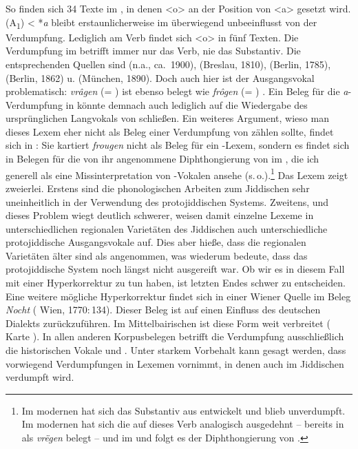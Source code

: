  
So finden sich 34 Texte im , in denen <o> an der Position von <a> gesetzt wird.  (A\textsubscript{1}) < {\urj} *\textit{a\textlengthmark} bleibt erstaunlicherweise im  überwiegend unbeeinflusst von der Verdumpfung. Lediglich am Verb  findet sich <o> in fünf Texten. Die Verdumpfung im \hai{{\LiJieins}} betrifft immer nur das Verb, nie das Substantiv. Die entsprechenden Quellen sind  (n.a., ca.\, 1900),  (Breslau, 1810),  (Berlin, 1785),  (Berlin, 1862) u.  (München, 1890). Doch auch hier ist der {\mhd} Ausgangsvokal problematisch: {\mhd} \textit{vrâgen} (= ) ist ebenso belegt wie \textit{frôgen} (= ) \parencite[Bd. 3, Sp. 487]{Lexer1992}. Ein Beleg für die \textit{a}-Verdumpfung in  könnte demnach auch lediglich auf die  Wiedergabe des ursprünglichen Langvokals von  schließen. Ein weiteres Argument, wieso man dieses Lexem eher nicht als Beleg einer Verdumpfung von  zählen sollte, findet sich in \cite[60f]{GuggenheimGruenberg1973}: Sie kartiert \textit{frougen} nicht als Beleg für ein -Lexem, sondern  es findet sich in Belegen für die von ihr angenommene Diphthongierung von  im \hai{{\SWJ}}, die ich  generell als eine Missinterpretation von -Vokalen ansehe (s.\,o.).\footnote{Im modernen \hai{{\OJ}} hat sich das Substantiv    aus  entwickelt und blieb unverdumpft. Im modernen \hai{{\OJ}} hat sich die  auf dieses Verb analogisch ausgedehnt – bereits in {\mhd} als \textit{vrëgen} belegt  \parencite[Bd. 3, Sp. 487]{Lexer1992} – und im \hai{{\NOJ}} und \hai{{\SOJ}} folgt es der Diphthongierung von    .
}
Das Lexem  zeigt zweierlei. Erstens sind die phonologischen Arbeiten zum Jiddischen sehr uneinheitlich in der Verwendung des protojiddischen Systems. Zweitens, und dieses Problem wiegt deutlich schwerer, weisen damit einzelne Lexeme in unterschiedlichen regionalen Varietäten des Jiddischen auch unterschiedliche protojiddische Ausgangsvokale auf. Dies aber hieße, dass die regionalen Varietäten älter sind als angenommen, was wiederum bedeute, dass das protojiddische System noch längst nicht ausgereift war. Ob wir es in diesem Fall mit einer Hyperkorrektur zu tun haben, ist letzten Endes schwer zu entscheiden. Eine weitere mögliche Hyperkorrektur  findet sich in einer Wiener Quelle im Beleg \textit{Nocht}  ( Wien, 1770:\,134). Dieser Beleg ist auf einen Einfluss des deutschen Dialekts zurückzuführen. Im Mittelbairischen ist diese Form weit verbreitet ( Karte ). In allen anderen Korpusbelegen betrifft die Verdumpfung ausschließlich die historischen Vokale  und . Unter starkem Vorbehalt kann gesagt werden, dass  vorwiegend Verdumpfungen in Lexemen vornimmt, in denen auch im Jiddischen verdumpft wird. 

